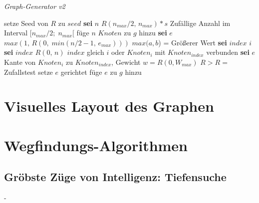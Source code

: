 \documentclass[12pt]{article}
\begin{document}
\renewcommand{\algorithmicrequire}{\textbf{geg.:}}
\renewcommand{\algorithmicensure}{\textbf{ges.:}}
\renewcommand{\algorithmicprocedure}{\textbf{prozedur}}
\renewcommand{\algorithmicfor}{\textbf{für}}
\renewcommand{\algorithmicdo}{\textbf{wiederhole}}
\renewcommand{\algorithmicend}{\textbf{ende}}
\renewcommand{\algorithmicrepeat}{\textbf{wiederhole}}
\renewcommand{\algorithmicif}{\textbf{wenn}}
\renewcommand{\algorithmicthen}{\textbf{dann}}
\renewcommand{\algorithmicuntil}{\textbf{solange}} %
\newcommand{\sei}{\textbf{sei }}

\begin{algorithm}
\caption{\textit{Graph-Generator v2} \label{alg:generatorv2}}
\begin{algorithmic}[1]
\Statex
{}
\Statex
{}
	\State setze Seed von $R$ zu $seed$
	\State \sei $n$ $R(n_{max}/2,\,n_{max}) * s$ \Comment Zufällige Anzahl im Interval $\big[n_{max}/2;\;n_{max}\big[$
	\State füge $n$ $Knoten$ zu $g$ hinzu
		\State \sei $e$ $max(1,\,R(0,\;min(n/2-1,\,e_{max})))$ \Comment $max(a,b$) = Größerer Wert
			\State \sei $index$ $i$
			\Repeat 
			\State \sei $index$ $R(0,\,n)$
			\Until $index$ gleich $i$ oder $Knoten_{i}$ mit $Knoten_{index}$ verbunden
			\State \sei $e$ Kante von $Knoten_{i}$ zu $Knoten_{index}$, Gewicht $w = R(0, W_{max})$
			 \State \Comment $R>R =$ Zufallstest
				\State setze $e$ gerichtet
			\EndIf
			\State füge $e$ zu $g$ hinzu
		\EndFor
	\EndFor
\EndProcedure
\end{algorithmic}
\end{algorithm}

\newpage
\clearpage
\section{Visuelles Layout des Graphen}
\label{sec:layout}
\newpage

\section{Wegfindungs-Algorithmen}
\newpage

\subsection{Gröbste Züge von Intelligenz: Tiefensuche}
\newpage
-
\newpage
\end{document}
